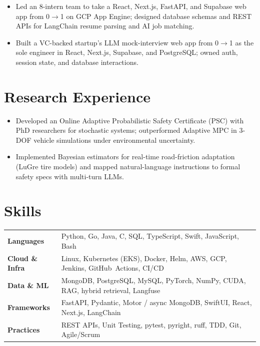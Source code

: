 \documentclass[11pt, letterpaper]{article}
\begin{document}
\vspace{1pt}
\begin{itemize}
  \item Led an 8-intern team to take a React, Next.js, FastAPI, and Supabase web app from 0$\to$1 on GCP App Engine; designed database schemas and REST APIs for LangChain resume parsing and AI job matching.
\end{itemize}

\vspace{1pt}
\begin{itemize}
  \item Built a VC-backed startup's LLM mock-interview web app from 0$\to$1 as the sole engineer in React, Next.js, Supabase, and PostgreSQL; owned auth, session state, and database interactions.
\end{itemize}

\section{Research Experience}
\begin{itemize}
  \item Developed an Online Adaptive Probabilistic Safety Certificate (PSC) with PhD researchers for stochastic systems; outperformed Adaptive MPC in 3-DOF vehicle simulations under environmental uncertainty.
  \item Implemented Bayesian estimators for real-time road-friction adaptation (LuGre tire models) and mapped natural-language instructions to formal safety specs with multi-turn LLMs.
\end{itemize}

\section{Skills}
\begin{tabularx}{\textwidth}{@{}l @{\hspace{7pt}} >{\raggedright\arraybackslash}X@{}}
  \textbf{Languages} & Python, Go, Java, C, SQL, TypeScript, Swift, JavaScript, Bash \\[1pt]
  \textbf{Cloud \& Infra} & Linux, Kubernetes (EKS), Docker, Helm, AWS, GCP, Jenkins, GitHub~Actions, CI/CD \\[1pt]
  \textbf{Data \& ML} & MongoDB, PostgreSQL, MySQL, PyTorch, NumPy, CUDA, RAG, hybrid retrieval, Langfuse \\[1pt]
  \textbf{Frameworks} & FastAPI, Pydantic, Motor / async MongoDB, SwiftUI, React, Next.js, LangChain \\[1pt]
  \textbf{Practices} & REST APIs, Unit Testing, pytest, pyright, ruff, TDD, Git, Agile/Scrum \\
\end{tabularx}
\end{document}
